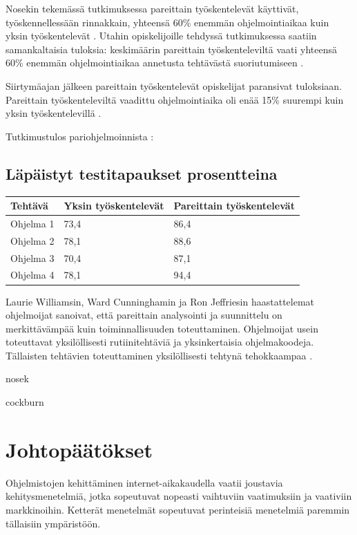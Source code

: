 \documentclass[finnish]{tktltiki2}
\theoremstyle{definition}
\theoremstyle{remark}
\begin{document}
Nosekin tekemässä tutkimuksessa pareittain työskentelevät käyttivät, työskennellessään rinnakkain, yhteensä 60\% enemmän ohjelmointiaikaa kuin yksin työskentelevät \cite{NOS98}. Utahin opiskelijoille tehdyssä tutkimuksessa saatiin samankaltaisia tuloksia: keskimäärin pareittain työskenteleviltä vaati yhteensä 60\% enemmän ohjelmointiaikaa annetusta tehtävästä suoriutumiseen \cite{WIL00}.

Siirtymäajan jälkeen pareittain työskentelevät opiskelijat paransivat tuloksiaan. Pareittain työskenteleviltä vaadittu ohjelmointiaika oli enää 15\% suurempi kuin yksin työskentelevillä \cite{WIL00}.

Tutkimustulos pariohjelmoinnista \cite{WIL00}:

\subsection*{Läpäistyt testitapaukset prosentteina}
\begin{center}
    \begin{tabular}{ | l | l | p{5cm} |}
    \hline
    Tehtävä & Yksin työskentelevät & Pareittain työskentelevät \\ \hline
    Ohjelma 1 & 73,4 & 86,4 \\ \hline
    Ohjelma 2 & 78,1 & 88,6 \\ \hline
    Ohjelma 3 & 70,4 & 87,1 \\ \hline
    Ohjelma 4 & 78,1 & 94,4 \\ \hline
    \end{tabular}
\end{center}


Laurie Williamsin, Ward Cunninghamin ja Ron Jeffriesin haastattelemat ohjelmoijat sanoivat, että pareittain analysointi ja suunnittelu on merkittävämpää kuin toiminnallisuuden toteuttaminen. Ohjelmoijat usein toteuttavat yksilöllisesti rutiinitehtäviä ja yksinkertaisia ohjelmakoodeja. Tällaisten tehtävien toteuttaminen yksilöllisesti tehtynä tehokkaampaa \cite{WIL00}.

nosek \cite{NOS98}

cockburn \cite{COC00a}

\section{Johtopäätökset}

Ohjelmistojen kehittäminen internet-aikakaudella vaatii joustavia kehitysmenetelmiä, jotka sopeutuvat nopeasti vaihtuviin vaatimuksiin ja vaativiin markkinoihin. Ketterät menetelmät sopeutuvat perinteisiä menetelmiä paremmin tällaisiin ympäristöön.
\end{document}
